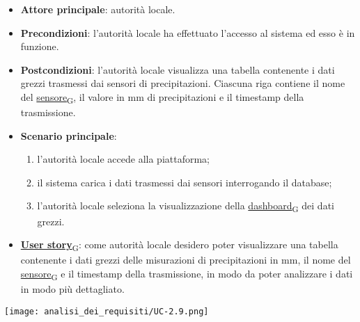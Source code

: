 \begin{itemize}
	\item \textbf{Attore principale}: autorità locale.
	\item \textbf{Precondizioni}: l'autorità locale ha effettuato l'accesso al sistema ed esso è in funzione.
	\item \textbf{Postcondizioni}: l'autorità locale visualizza una tabella contenente i dati grezzi trasmessi dai sensori di precipitazioni.
	      Ciascuna riga contiene il nome del \href{https://7last.github.io/docs/pb/documentazione-interna/glossario\#sensore}{sensore\textsubscript{G}}, il valore in mm di precipitazioni e il timestamp della trasmissione.
	\item \textbf{Scenario principale}:
	      \begin{enumerate}
		      \item l'autorità locale accede alla piattaforma;
		      \item il sistema carica i dati trasmessi dai sensori interrogando il database;
		      \item l'autorità locale seleziona la visualizzazione della \href{https://7last.github.io/docs/pb/documentazione-interna/glossario\#dashboard}{dashboard\textsubscript{G}} dei dati grezzi.
	      \end{enumerate}
	\item \href{https://7last.github.io/docs/pb/documentazione-interna/glossario\#user-story}{\textbf{User story}\textsubscript{G}}:
	      come autorità locale desidero poter visualizzare una tabella contenente i dati grezzi delle misurazioni di precipitazioni in mm,
	      il nome del \href{https://7last.github.io/docs/pb/documentazione-interna/glossario\#sensore}{sensore\textsubscript{G}} e il timestamp della trasmissione, in modo da poter analizzare i dati in modo più dettagliato.
\end{itemize}
\begin{center}
	\texttt{[image: analisi\_dei\_requisiti/UC-2.9.png]}
\end{center}


